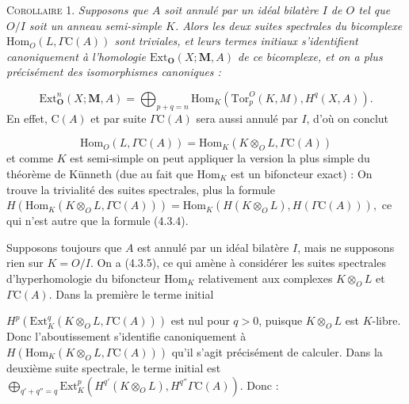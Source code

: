 \clearpage
{}

\textsc{Corollaire 1.} \textit{Supposons que $A$ soit annulé par un
idéal bilatère $I$ de $O$ tel que $O/I$ soit un anneau semi-simple $K$. Alors
les deux suites spectrales du bicomplexe $\mathrm{Hom}_O(L,\Gamma \mathrm C(A))$ sont
triviales, et leurs termes initiaux s'identifient canoniquement à l'homologie
$\mathrm{Ext}_{\mathbf O}(X;\mathbf M,A)$ de ce bicomplexe, et on a plus
précisément des isomorphismes canoniques :}

\[
\tag{4.3.4}
\mathrm{Ext}_{\mathbf O}^n(X;\mathbf M,A)=
\bigoplus_{p+q=n}
\mathrm{Hom}_K(\mathrm{Tor}_p^O(K,M),H^q(X,A)).
\]
En effet, $\mathrm C(A)$ et par suite $\Gamma \mathrm C(A)$ sera aussi annulé par $I$, d'où on
conclut

\[
\tag{4.3.5}
\mathrm{Hom}_O(L,\Gamma \mathrm C(A))=
\mathrm{Hom}_K(K\otimes_O L,\Gamma \mathrm C(A))
\]
et comme $K$ est semi-simple on peut appliquer la version la plus simple du
théorème de Künneth (due au fait que $\mathrm{Hom}_K$ est un bifoncteur exact) :
On trouve la trivialité des suites spectrales, plus la formule
$H(\mathrm{Hom}_K(K\otimes_O L,\Gamma \mathrm C(A)))=
\mathrm{Hom}_K(H(K\otimes_O L),H(\Gamma \mathrm C(A))),$
ce qui n'est autre que la formule (4.3.4).

Supposons toujours que $A$ est annulé par un idéal bilatère $I$, mais ne
supposons rien sur $K=O/I$. On a (4.3.5), ce qui amène à considérer les suites
spectrales d'hyperhomologie du bifoncteur $\mathrm{Hom}_K$ relativement aux
complexes $K\otimes_O L$ et $\Gamma \mathrm C(A)$. Dans la première le terme initial

$H^p(\mathrm{Ext}_K^q(K\otimes_O L,\Gamma \mathrm C(A)))$ est nul pour $q>0$, puisque
$K\otimes_O L$ est $K$-libre. Donc l'aboutissement s'identifie canoniquement à
$H(\mathrm{Hom}_K(K\otimes_O L,\Gamma \mathrm C(A)))$ qu'il s'agit précisément de
calculer. Dans la deuxième suite spectrale, le terme initial est
$\displaystyle \bigoplus_{q'+q''=q}
\mathrm{Ext}_K^p(H^{q'}(K\otimes_O L),H^{q''}\Gamma \mathrm C(A)).$
Donc :


